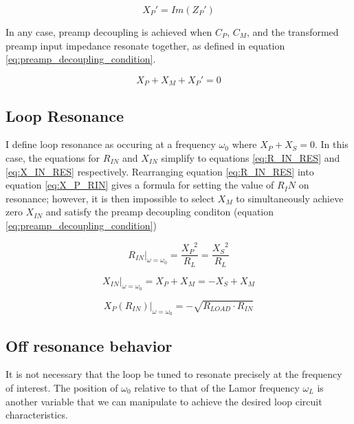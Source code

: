 \begin{equation} \label{eq:X_PREAMP}
    {X_P}'=Im({Z_P}')
\end{equation}
    
In any case, preamp decoupling is achieved when $C_P$, $C_M$, and the transformed preamp input impedance resonate
together, as defined in equation \ref{eq:preamp_decoupling_condition}.

\begin{equation} \label{eq:preamp_decoupling_condition}
    X_P + X_M +{X_P}' = 0
\end{equation}


\subsection{Loop Resonance}

I define loop resonance as occuring at a frequency $\omega_0$ where $X_P + X_S = 0$. In this case, the equations for
$R_{IN}$ and $X_{IN}$ simplify to equations \ref{eq:R_IN_RES} and \ref{eq:X_IN_RES} respectively. Rearranging equation
\ref{eq:R_IN_RES} into equation \ref{eq:X_P_RIN} gives a formula for setting the value of $R_IN$ on resonance; however,
it is then impossible to select $X_M$ to simultaneously achieve zero $X_{IN}$ and satisfy the preamp decoupling conditon
(equation \ref{eq:preamp_decoupling_condition})


\begin{equation} \label{eq:R_IN_RES}
    R_{IN}\big|_{\omega=\omega_0}=\frac{{X_P}^2}{R_L} = \frac{{X_S}^2}{R_L} 
\end{equation}

\begin{equation} \label{eq:X_IN_RES}
    X_{IN}\big|_{\omega=\omega_0}=X_P+X_M=-X_S+X_M
\end{equation}

\begin{equation} \label{eq:X_P_RIN}
    X_{P}(R_{IN})\big|_{\omega=\omega_0}=-\sqrt{R_{LOAD} \cdot R_{IN}} 
\end{equation}

\subsection{Off resonance behavior}
It is not necessary that the loop be tuned to resonate precisely at the frequency of interest. The position of
$\omega_0$ relative to that of the Lamor frequency $\omega_L$ is another variable that we can manipulate to achieve the
desired loop circuit characteristics.


